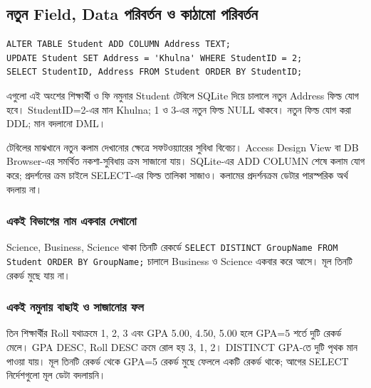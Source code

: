\subsection{নতুন Field, Data পরিবর্তন ও কাঠামো পরিবর্তন}
\begin{verbatim}
ALTER TABLE Student ADD COLUMN Address TEXT;
UPDATE Student SET Address = 'Khulna' WHERE StudentID = 2;
SELECT StudentID, Address FROM Student ORDER BY StudentID;
\end{verbatim}
এগুলো এই অংশের শিক্ষার্থী ও ফি নমুনার Student টেবিলে SQLite দিয়ে চালালে নতুন Address ফিল্ড যোগ হবে। StudentID=2-এর মান Khulna; 1 ও 3-এর নতুন ফিল্ড NULL থাকবে। নতুন ফিল্ড যোগ করা DDL; মান বদলানো DML।

টেবিলের মাঝখানে নতুন কলাম দেখানোর ক্ষেত্রে সফটওয়্যারের সুবিধা বিবেচ্য। Access Design View বা DB Browser-এর সমর্থিত নকশা-সুবিধায় ক্রম সাজানো যায়। SQLite-এর ADD COLUMN শেষে কলাম যোগ করে; প্রদর্শনের ক্রম চাইলে SELECT-এর ফিল্ড তালিকা সাজাও। কলামের প্রদর্শনক্রম ডেটার পারস্পরিক অর্থ বদলায় না।

\subsubsection{একই বিভাগের নাম একবার দেখানো}
Science, Business, Science থাকা তিনটি রেকর্ডে \texttt{SELECT DISTINCT GroupName FROM Student ORDER BY GroupName;} চালালে Business ও Science একবার করে আসে। মূল তিনটি রেকর্ড মুছে যায় না।

\subsubsection{একই নমুনায় বাছাই ও সাজানোর ফল}
তিন শিক্ষার্থীর Roll যথাক্রমে 1, 2, 3 এবং GPA 5.00, 4.50, 5.00 হলে GPA=5 শর্তে দুটি রেকর্ড মেলে। GPA DESC, Roll DESC ক্রমে রোল হয় 3, 1, 2। DISTINCT GPA-তে দুটি পৃথক মান পাওয়া যায়। মূল তিনটি রেকর্ড থেকে GPA=5 রেকর্ড মুছে ফেললে একটি রেকর্ড থাকে; আগের SELECT নির্দেশগুলো মূল ডেটা বদলায়নি।

